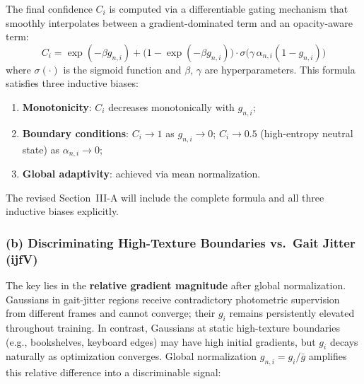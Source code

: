 \documentclass[10pt,a4paper]{article}
\begin{document}
The final confidence $C_i$ is computed via a differentiable gating mechanism that smoothly interpolates between a gradient-dominated term and an opacity-aware term:
\begin{equation}
  C_i = \exp(-\beta g_{n,i}) + \bigl(1 - \exp(-\beta g_{n,i})\bigr)\cdot\sigma\!\bigl(\gamma\,\alpha_{n,i}(1-g_{n,i})\bigr)
\end{equation}
where $\sigma(\cdot)$ is the sigmoid function and $\beta$, $\gamma$ are hyperparameters. This formula satisfies three inductive biases:
\begin{enumerate}[leftmargin=2em,topsep=2pt,itemsep=1pt]
  \item \textbf{Monotonicity}: $C_i$ decreases monotonically with $g_{n,i}$;
  \item \textbf{Boundary conditions}: $C_i \to 1$ as $g_{n,i} \to 0$; $C_i \to 0.5$ (high-entropy neutral state) as $\alpha_{n,i} \to 0$;
  \item \textbf{Global adaptivity}: achieved via mean normalization.
\end{enumerate}
The revised Section~III-A will include the complete formula and all three inductive biases explicitly.

\subsubsection*{(b) Discriminating High-Texture Boundaries vs.\ Gait Jitter (ijfV)}

The key lies in the \textbf{relative gradient magnitude} after global normalization. Gaussians in gait-jitter regions receive contradictory photometric supervision from different frames and cannot converge; their $g_i$ remains persistently elevated throughout training. In contrast, Gaussians at static high-texture boundaries (e.g., bookshelves, keyboard edges) may have high initial gradients, but $g_i$ decays naturally as optimization converges. Global normalization $g_{n,i} = g_i / \bar{g}$ amplifies this relative difference into a discriminable signal:

\begin{table}[h]
\centering\small
{}
\end{table}
\end{document}
